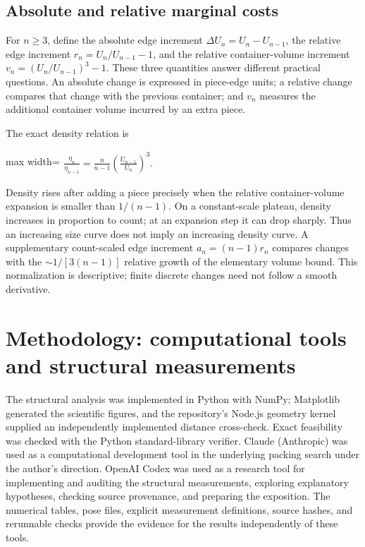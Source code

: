 \documentclass[11pt,a4paper]{article}
\begin{document}
\subsection{Absolute and relative marginal costs}

For $n\ge3$, define the absolute edge increment $\Delta U_n=U_n-U_{n-1}$, the relative edge increment $r_n=U_n/U_{n-1}-1$, and the relative container-volume increment $v_n=(U_n/U_{n-1})^3-1$. These three quantities answer different practical questions. An absolute change is expressed in piece-edge units; a relative change compares that change with the previous container; and $v_n$ measures the additional container volume incurred by an extra piece.

The exact density relation is

\begin{center}\begin{adjustbox}{max width=\linewidth}$\displaystyle\begin{aligned}
\frac{\eta_n}{\eta_{n-1}}=\frac{n}{n-1}\left(\frac{U_{n-1}}{U_n}\right)^3.
\end{aligned}$\end{adjustbox}\end{center}

Density rises after adding a piece precisely when the relative container-volume expansion is smaller than $1/(n-1)$. On a constant-scale plateau, density increases in proportion to count; at an expansion step it can drop sharply. Thus an increasing size curve does not imply an increasing density curve. A supplementary count-scaled edge increment $a_n=(n-1)r_n$ compares changes with the $\sim1/[3(n-1)]$ relative growth of the elementary volume bound. This normalization is descriptive; finite discrete changes need not follow a smooth derivative.

\section{Methodology: computational tools and structural measurements}

The structural analysis was implemented in Python with NumPy; Matplotlib generated the scientific figures, and the repository's Node.js geometry kernel supplied an independently implemented distance cross-check. Exact feasibility was checked with the Python standard-library verifier. Claude (Anthropic) was used as a computational development tool in the underlying packing search under the author's direction. OpenAI Codex was used as a research tool for implementing and auditing the structural measurements, exploring explanatory hypotheses, checking source provenance, and preparing the exposition. The numerical tables, pose files, explicit measurement definitions, source hashes, and rerunnable checks provide the evidence for the results independently of these tools.
\end{document}
